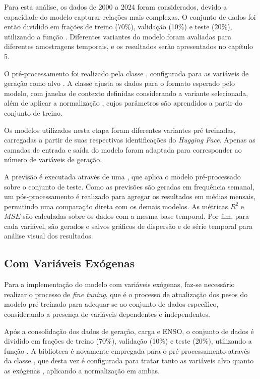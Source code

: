 Para esta análise, os dados de 2000 a 2024 foram considerados, devido a capacidade do modelo capturar relações mais complexas. 
O conjunto de dados foi então dividido em frações de treino (70\%), validação (10\%) e teste (20\%), utilizando a função 
. Diferentes variantes do modelo foram avaliadas para diferentes amostragens temporais, e os resultados 
serão apresentados no capítulo 5.

O pré-processamento foi realizado pela classe , configurada para as variáveis de geração como 
alvo . A classe ajusta os dados para o formato esperado pelo modelo, com janelas de contexto definidas
considerando a variante selecionada, além de aplicar a normalização , cujos parâmetros são aprendidos 
a partir do conjunto de treino.

Os modelos  utilizados nesta etapa foram diferentes variantes pré treinadas, carregadas a partir
de suas respectivas identificações do \textit{Hugging Face}. Apenas as camadas de entrada e saída do modelo foram adaptada 
para corresponder ao número de variáveis de geração.

A previsão é executada através de uma , que aplica o modelo pré-processado sobre o conjunto 
de teste. Como as previsões são geradas em frequência semanal, um pós-processamento é realizado para agregar os resultados em 
médias mensais, permitindo uma comparação direta com os demais modelos. As métricas $R^2$ e $MSE$ são calculadas sobre os dados 
com a mesma base temporal. Por fim, para cada variável, são gerados e salvos gráficos de dispersão e de série temporal para 
análise visual dos resultados.


\subsection{Com Variáveis Exógenas} %
Para a implementação do modelo com variáveis exógenas, faz-se necessário realizar o processo de \textit{fine tuning}, que 
é o processo de atualização dos pesos do modelo pré treinado para adequar-se ao conjunto de dados específico, considerando
a presença de variáveis dependentes e independentes.

Após a consolidação dos dados de geração, carga e ENSO, o conjunto de dados é dividido em frações de treino (70\%), validação 
(10\%) e teste (20\%), utilizando a função . A biblioteca  é novamente empregada 
para o pré-processamento através da classe , que desta vez é configurada para tratar tanto as variáveis 
alvo  quanto as exógenas , aplicando a normalização  em ambas.

